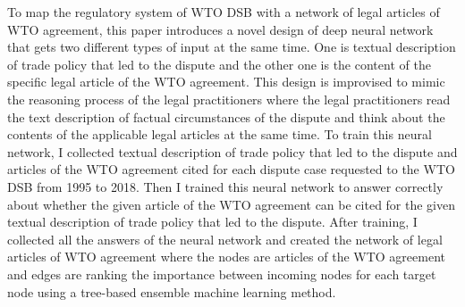 To map the regulatory system of WTO DSB with a network of legal articles of WTO agreement,
this paper introduces a novel design of deep neural network \citep{DBLP:journals/corr/Schmidhuber14} that
gets two different types of input at the same time.
One is textual description of trade policy that led to the dispute and
the other one is the content of the specific legal article of the WTO agreement.
This design is improvised to mimic
the reasoning process of the legal practitioners
where the legal practitioners read
the text description of
factual circumstances of the dispute and think about the contents of
the applicable legal articles at the same time.
To train this neural network, I collected textual description of trade policy 
that led to the dispute and articles of the WTO agreement cited for each dispute
case requested to the WTO DSB 
from 1995 to 2018.
Then I trained this neural network to answer correctly 
about whether the given article of the WTO agreement
can be cited for the given textual description of 
trade policy that led to the dispute.
After training, I collected all the answers of the neural network 
and created the network of legal articles of WTO agreement where 
the nodes are articles of the WTO agreement 
and edges are ranking the importance between incoming nodes for each 
target node using a tree-based ensemble machine learning method.



